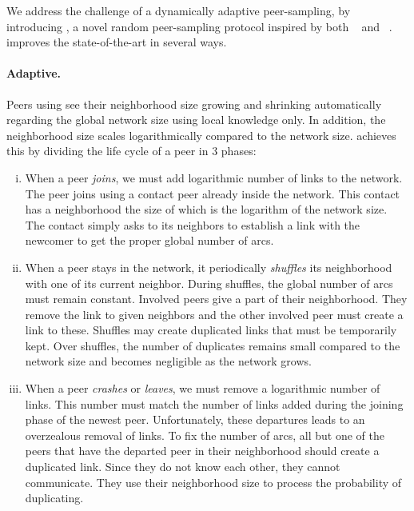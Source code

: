 We address the challenge of a dynamically adaptive peer-sampling,
by introducing \SPRAY, a novel random peer-sampling protocol inspired by both
\SCAMP~\cite{ganesh2001scamp,ganesh2003peer} and
\CYCLON~\cite{voulgaris2005cyclon}. \SPRAY improves the state-of-the-art in
several ways.

\paragraph{Adaptive.}
Peers using \SPRAY see their neighborhood size growing and shrinking
automatically regarding the global network size using local knowledge only. In
addition, the neighborhood size scales logarithmically compared to the network
size. \SPRAY achieves this by dividing the life cycle of a peer in 3 phases: 
\begin{enumerate}[(i)]
\item When a peer \emph{joins}, we must add logarithmic number of links to the
  network. The peer joins using a contact peer already inside the network. This
  contact has a neighborhood the size of which is the logarithm of the network
  size. The contact simply asks to its neighbors to establish a link with the
  newcomer to get the proper global number of arcs.
\item When a peer stays in the network, it periodically \emph{shuffles} its
  neighborhood with one of its current neighbor. During shuffles, the global
  number of arcs must remain constant. Involved peers give a part of their
  neighborhood. They remove the link to given neighbors and the other involved
  peer must create a link to these. Shuffles may create duplicated links that
  must be temporarily kept.  Over shuffles, the number of duplicates remains
  small compared to the network size and becomes negligible as the network
  grows.
\item When a peer \emph{crashes} or \emph{leaves}, we must remove a logarithmic
  number of links. This number must match the number of links added during the
  joining phase of the newest peer. Unfortunately, these departures leads to an
  overzealous removal of links. To fix the number of arcs, all but one of the
  peers that have the departed peer in their neighborhood should create a
  duplicated link. Since they do not know each other, they cannot
  communicate. They use their neighborhood size to process the probability of
  duplicating.
\end{enumerate}



